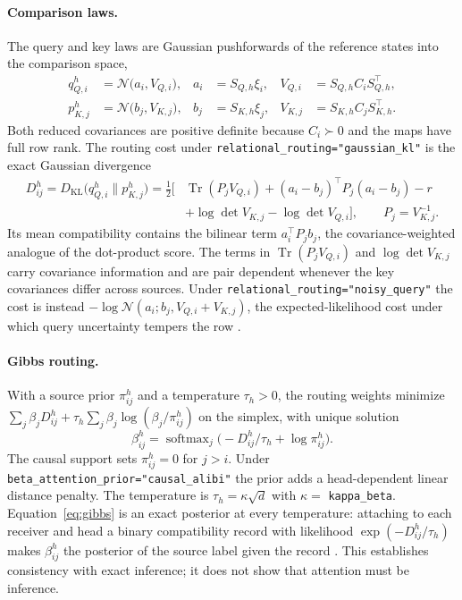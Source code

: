 \documentclass[11pt]{article}
\theoremstyle{definition}
\theoremstyle{remark}
\newcommand{\KL}{D_{\mathrm{KL}}}
\newcommand{\softmax}{\operatorname{softmax}}
\newcommand{\Tr}{\operatorname{Tr}}
\newcommand{\N}{\mathcal{N}}
\newcommand{\cfg}[1]{\texttt{#1}}
\begin{document}
\paragraph{Comparison laws.}
The query and key laws are Gaussian pushforwards of the reference states into the comparison space,
\begin{equation}
\begin{aligned}
q_{Q,i}^{h}&=\N\bigl(a_i,V_{Q,i}\bigr),&a_i&=S_{Q,h}\xi_i,&V_{Q,i}&=S_{Q,h}C_iS_{Q,h}^{\top},\\
p_{K,j}^{h}&=\N\bigl(b_j,V_{K,j}\bigr),&b_j&=S_{K,h}\xi_j,&V_{K,j}&=S_{K,h}C_jS_{K,h}^{\top}.
\end{aligned}
\label{eq:comparison_laws}
\end{equation}
Both reduced covariances are positive definite because $C_i\succ0$ and the maps have full row rank. The routing cost under \cfg{relational\_routing="gaussian\_kl"} is the exact Gaussian divergence
\begin{equation}
\begin{aligned}
D_{ij}^{h}=\KL\bigl(q_{Q,i}^{h}\|p_{K,j}^{h}\bigr)
=\tfrac12\bigl[&\Tr(P_jV_{Q,i})+(a_i-b_j)^{\top}P_j(a_i-b_j)-r\\
&+\log\det V_{K,j}-\log\det V_{Q,i}\bigr],
\qquad P_j=V_{K,j}^{-1}.
\end{aligned}
\label{eq:routing_cost}
\end{equation}
Its mean compatibility contains the bilinear term $a_i^{\top}P_jb_j$, the covariance-weighted analogue of the dot-product score. The terms in $\Tr(P_jV_{Q,i})$ and $\log\det V_{K,j}$ carry covariance information and are pair dependent whenever the key covariances differ across sources. Under \cfg{relational\_routing="noisy\_query"} the cost is instead $-\log\N(a_i;b_j,V_{Q,i}+V_{K,j})$, the expected-likelihood cost under which query uncertainty tempers the row \citep{dennis2026glk}.

\paragraph{Gibbs routing.}
With a source prior $\pi_{ij}^{h}$ and a temperature $\tau_h>0$, the routing weights minimize
$\sum_j\beta_jD_{ij}^{h}+\tau_h\sum_j\beta_j\log(\beta_j/\pi_{ij}^{h})$ on the simplex, with unique solution
\begin{equation}
\beta_{ij}^{h}=\softmax_j\bigl(-D_{ij}^{h}/\tau_h+\log\pi_{ij}^{h}\bigr).
\label{eq:gibbs}
\end{equation}
The causal support sets $\pi_{ij}^{h}=0$ for $j>i$. Under \cfg{beta\_attention\_prior="causal\_alibi"} the prior adds a head-dependent linear distance penalty. The temperature is $\tau_h=\kappa\sqrt d$ with $\kappa=$ \cfg{kappa\_beta}. Equation~\eqref{eq:gibbs} is an exact posterior at every temperature: attaching to each receiver and head a binary compatibility record with likelihood $\exp(-D_{ij}^{h}/\tau_h)$ makes $\beta_{ij}^{h}$ the posterior of the source label given the record \citep{dennis2026glk}. This establishes consistency with exact inference; it does not show that attention must be inference.
\end{document}
